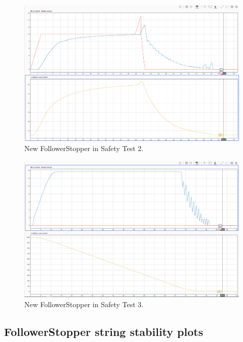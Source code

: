 \documentclass[conference]{IEEEtran}
\begin{document}
\begin{appendix}
\begin{figure}[htbp]
\centerline{\includegraphics[width=5.71 in]{newFS_safety2.png}}
\caption{New FollowerStopper in Safety Test 2.}
\label{newsafe2}
\end{figure}

\begin{figure}[htbp]
\centerline{\includegraphics[width=5.71 in]{newFS_safety3.png}}
\caption{New FollowerStopper in Safety Test 3.}
\label{newsafe3}
\end{figure}


\pagebreak
\subsection{FollowerStopper string stability plots}


\end{appendix}
\end{document}
